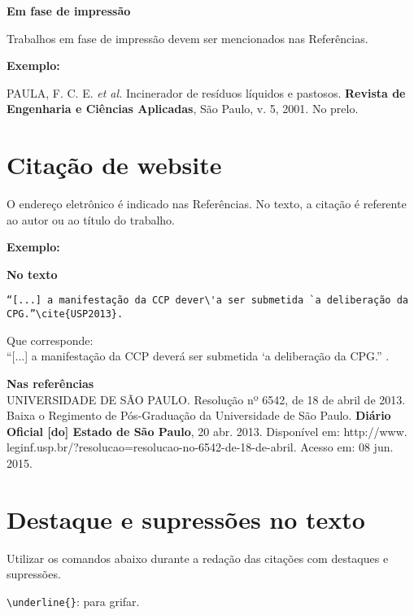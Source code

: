 \textbf{Em fase de impressão}

Trabalhos em fase de impressão devem ser mencionados nas Refer\^encias.

\textbf{Exemplo:}

\begin{alineas}
	\item
PAULA, F. C. E. \textit{et al.} Incinerador de resíduos líquidos e pastosos. \textbf{Revista de
Engenharia e Ci\^encias Aplicadas}, São Paulo, v. 5, 2001. No prelo.
\end{alineas}


\section{Citação de website}

O endereço eletrônico \'e indicado nas Refer\^encias. No texto, a citação \'e referente ao autor ou ao título do trabalho. 

\textbf{Exemplo:}

\begin{alineas}
\item
\textbf{No texto}
\begin{verbatim}
“[...] a manifestação da CCP dever\'a ser submetida `a deliberação da
CPG.”\cite{USP2013}.
\end{verbatim}
Que corresponde:\\
“[...] a manifestação da CCP dever\'a ser submetida `a deliberação da
CPG.” \cite{USP2013}. \\

\item 
\textbf{Nas refer\^encias}\\

UNIVERSIDADE DE SÃO PAULO. Resolução nº 6542, de 18 de abril de 2013.
Baixa o Regimento de Pós-Graduação da Universidade de São Paulo. \textbf{Di\'ario
Oficial [do] Estado de São Paulo}, 20 abr. 2013. Disponível em: http://www.
leginf.usp.br/?resolucao=resolucao-no-6542-de-18-de-abril. Acesso em: 08 jun.
2015.
\end{alineas}

\section{Destaque e supressões no texto}

Utilizar os comandos abaixo durante a redação das citações com destaques e supressões.

\verb+\underline{}+: para grifar.

